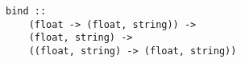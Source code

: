\begin{verbatim}
bind ::
    (float -> (float, string)) ->
    (float, string) ->
    ((float, string) -> (float, string))
\end{verbatim}
